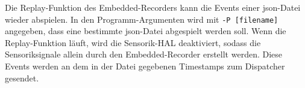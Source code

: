 Die Replay-Funktion des Embedded-Recorders kann die Events einer json-Datei wieder abspielen.
In den Programm-Argumenten wird mit \verb|-P [filename]| angegeben, dass eine bestimmte json-Datei
abgespielt werden soll.
Wenn die Replay-Funktion läuft, wird die Sensorik-HAL deaktiviert,
sodass die Sensoriksignale allein durch den Embedded-Recorder erstellt werden.
Diese Events werden an dem in der Datei gegebenen Timestamps zum Dispatcher gesendet.
